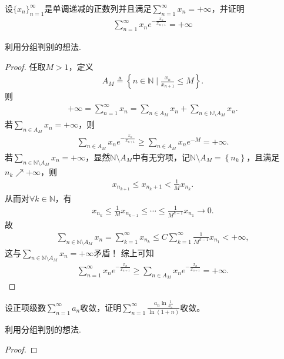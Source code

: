 \documentclass[../../main.tex]{subfiles}%
\begin{document}
\begin{example}
设$\{ x_n \}_{n=1}^{\infty}$是单调递减的正数列并且满足$\sum_{n=1}^{\infty} x_n = +\infty$，并证明
\begin{align*}
\sum_{n=1}^{\infty} x_n e^{-\frac{x_n}{x_{n+1}}} = +\infty
\end{align*}
\end{example}
\begin{note}
利用分组判别的想法.
\end{note}
\begin{proof}

任取$M>1$，定义
\begin{align*}
A_M\triangleq \left\{ n\in \mathbb{N} \mid \frac{x_n}{x_{n+1}}\leqslant M \right\} .
\end{align*}
则
\begin{align*}
+\infty =\sum_{n=1}^{\infty}{x_n}=\sum_{n\in A_M}{x_n}+\sum_{n\in \mathbb{N} \setminus A_M}{x_n}.
\end{align*}
若$\sum_{n\in A_M}{x_n}=+\infty$，则
\begin{align*}
\sum_{n\in A_M}{x_ne^{-\frac{x_n}{x_{n+1}}}}\geqslant \sum_{n\in A_M}{x_ne^{-M}}=+\infty .
\end{align*}
若$\sum_{n\in \mathbb{N} \setminus A_M}{x_n}=+\infty$，显然$\mathbb{N} \setminus A_M$中有无穷项，记$\mathbb{N} \setminus A_M=\left\{ n_k \right\}$，且满足$n_k\nearrow +\infty$，则
\begin{align*}
x_{n_{k+1}}\leqslant x_{n_k+1}<\frac{1}{M}x_{n_k}.
\end{align*}
从而对$\forall k\in \mathbb{N}$，有
\begin{align*}
x_{n_k}\leqslant \frac{1}{M}x_{n_{k-1}}\leqslant \cdots \leqslant \frac{1}{M^{k-1}}x_{n_1}\rightarrow 0.
\end{align*}
故
\begin{align*}
\sum_{n\in \mathbb{N} \setminus A_M}{x_n}=\sum_{k=1}^{\infty}{x_{n_k}}\leqslant C\sum_{k=1}^{\infty}{\frac{1}{M^{k-1}}x_{n_1}}<+\infty ,
\end{align*}
这与$\sum_{n\in \mathbb{N} \setminus A_M}{x_n}=+\infty$矛盾！
综上可知
\begin{align*}
\sum_{n=1}^{\infty}{x_ne^{-\frac{x_n}{x_{n+1}}}}\geqslant \sum_{n\in A_M}{x_ne^{-\frac{x_n}{x_{n+1}}}}=+\infty .
\end{align*}

\end{proof}

\begin{example}
设正项级数$\sum_{n=1}^{\infty} a_n$收敛，证明$\sum_{n=1}^{\infty} \frac{a_n \ln \frac{1}{a_n}}{\ln (1 + n)}$收敛。
\end{example}
\begin{note}
利用分组判别的想法.
\end{note}
\begin{proof}


\end{proof}
\end{document}
